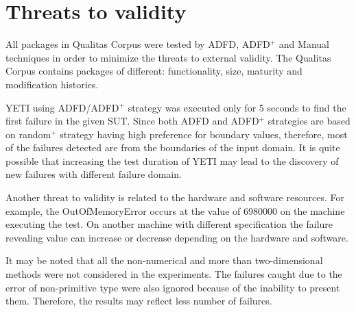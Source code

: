 


\section{Threats to validity} \label{sec:threat}
All packages in Qualitas Corpus were tested by ADFD, ADFD$^+$ and Manual techniques in order to minimize the threats to external validity. The Qualitas Corpus contains packages of different: functionality, size, maturity and modification histories.

YETI using ADFD/ADFD$^+$ strategy was executed only for 5 seconds to find the first failure in the given SUT. Since both ADFD and ADFD$^+$ strategies are based on random$^+$ strategy having high preference for boundary values, therefore, most of the failures detected are from the boundaries of the input domain. It is quite possible that increasing the test duration of YETI may lead to the discovery of new failures with different failure domain.

Another threat to validity is related to the hardware and software resources. For example, the OutOfMemoryError occurs at the value of 6980000 on the machine executing the test. On another machine with different specification the failure revealing value can increase or decrease depending on the hardware and software.

It may be noted that all the non-numerical and more than two-dimensional methods were not considered in the experiments. The failures caught due to the error of non-primitive type were also ignored because of the inability to present them. Therefore, the results may reflect less number of failures.













